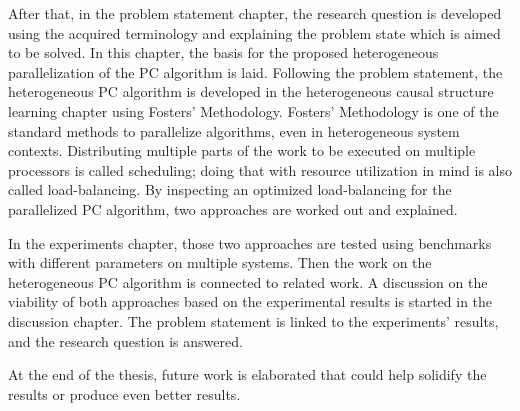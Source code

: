 After that, in the problem statement chapter, the research question is developed using the acquired terminology and explaining the problem state which is aimed to be solved. In this chapter, the basis for the proposed heterogeneous parallelization of the PC algorithm is laid. Following the problem statement, the heterogeneous PC algorithm is developed in the heterogeneous causal structure learning chapter using Fosters' Methodology. Fosters' Methodology is one of the standard methods to parallelize algorithms, even in heterogeneous system contexts. Distributing multiple parts of the work to be executed on multiple processors is called scheduling; doing that with resource utilization in mind is also called load-balancing. By inspecting an optimized load-balancing for the parallelized PC algorithm, two approaches are worked out and explained.

In the experiments chapter, those two approaches are tested using benchmarks with different parameters on multiple systems. Then the work on the heterogeneous PC algorithm is connected to related work. A discussion on the viability of both approaches based on the experimental results is started in the discussion chapter. The problem statement is linked to the experiments' results, and the research question is answered.

At the end of the thesis, future work is elaborated that could help solidify the results or produce even better results.

% 



